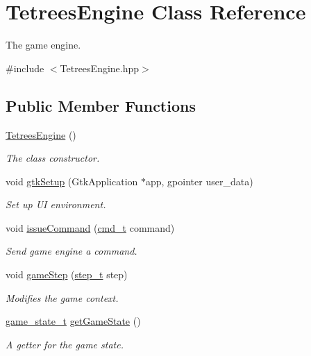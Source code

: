 \hypertarget{classTetreesEngine}{}\section{Tetrees\+Engine Class Reference}
\label{classTetreesEngine}


The game engine.  




{\ttfamily \#include $<$Tetrees\+Engine.\+hpp$>$}

\subsection*{Public Member Functions}
\begin{DoxyCompactItemize}
\item 
\hyperlink{classTetreesEngine_ada1775237223604c895a50625eda1d49}{Tetrees\+Engine} ()
\begin{DoxyCompactList}\small\item\em The class constructor. \end{DoxyCompactList}\item 
void \hyperlink{classTetreesEngine_a85e0da200fb3e17745f1978d24acca2f}{gtk\+Setup} (Gtk\+Application $\ast$app, gpointer user\+\_\+data)
\begin{DoxyCompactList}\small\item\em Set up UI environment. \end{DoxyCompactList}\item 
void \hyperlink{classTetreesEngine_aa2a283d09b0b6ab7c03ea2265a2e3438}{issue\+Command} (\hyperlink{TetreesDefs_8hpp_aadc337e2620d6621659e63e87c45e79d}{cmd\+\_\+t} command)
\begin{DoxyCompactList}\small\item\em Send game engine a command. \end{DoxyCompactList}\item 
void \hyperlink{classTetreesEngine_a33e9983a618b3538640b6bd987304b8b}{game\+Step} (\hyperlink{TetreesDefs_8hpp_a4d5a793092a473f85b4c1f7faf62afed}{step\+\_\+t} step)
\begin{DoxyCompactList}\small\item\em Modifies the game context. \end{DoxyCompactList}\item 
\hyperlink{TetreesDefs_8hpp_aebae08b2e3a36f1452b33acaf1eaab40}{game\+\_\+state\+\_\+t} \hyperlink{classTetreesEngine_a36e231a33457f87875f19d308984b0b8}{get\+Game\+State} ()
\begin{DoxyCompactList}\small\item\em A getter for the game state. \end{DoxyCompactList}\item 

\end{DoxyCompactItemize}
